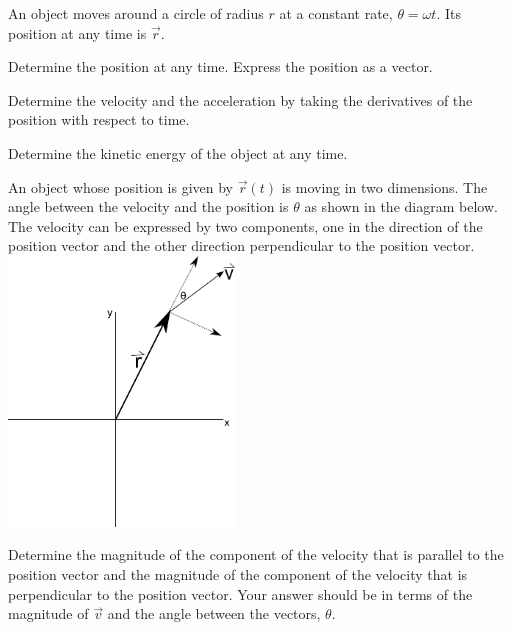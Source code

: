 \begin{problem}
\item An object moves around a circle of radius $r$  at a constant
  rate, $\theta=\omega t$. Its position at any time is $\vec{r}$.

  \begin{subproblem}
  \item Determine the position at any time. Express the position as
    a vector.
    \vfill
  \item Determine the velocity and the acceleration by taking the
    derivatives of the position with respect to time.
    \vfill
  \item Determine the kinetic energy of the object at any time.
    \vfill
  \end{subproblem}

  \clearpage

\item An object whose position is given by $\vec{r}(t)$ is moving in
  two dimensions. The angle between the velocity and the position is
  $\theta$ as shown in the diagram below. The velocity can be
  expressed by two components, one in the direction of the position
  vector and the other direction
  perpendicular to the position vector. \\
  \includegraphics[width=6cm]{ink/week12/angularComponents}

  \begin{subproblem}
  \item Determine the magnitude of the component of the velocity that
    is parallel to the position vector and the magnitude of the
    component of the velocity that is perpendicular to the position
    vector. Your answer should be in terms of the magnitude of
    $\vec{v}$ and the angle between the vectors, $\theta$.  


\end{subproblem}
\end{problem}
